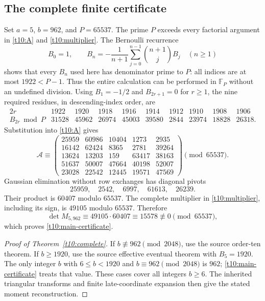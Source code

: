 \subsection{The complete finite certificate}

Set $a=5$, $b=962$, and $P=65537$. The prime $P$ exceeds every
factorial argument in \eqref{t10:A} and \eqref{t10:multiplier}.
The Bernoulli recurrence
\begin{equation}\label{t10:Brec}
 B_0=1,\qquad
 B_n=-\frac1{n+1}\sum_{j=0}^{n-1}\binom{n+1}{j}B_j
 \quad(n\ge1)
\end{equation}
shows that every $B_n$ used here has denominator prime to $P$:
all indices are at most $1922<P-1$. Thus the entire calculation
can be performed in $\mathbb F_P$ without an undefined division.
Using $B_1=-1/2$ and $B_{2r+1}=0$ for $r\ge1$, the nine required
residues, in descending-index order, are
\begin{equation}\label{t10:Bvalues}
\begin{array}{c|rrrrrrrrr}
2r&1922&1920&1918&1916&1914&1912&1910&1908&1906\\\hline
 B_{2r}\bmod P&31528&45962&26974&45003&39580&2844&23974&18828&26318.
\end{array}
\end{equation}
Substitution into \eqref{t10:A} gives
\begin{equation}\label{t10:Amatrix}
\mathcal A\equiv
\begin{pmatrix}
25959&60986&10404&1273&2935\\
16142&62424&8365&2781&39264\\
13624&13203&159&63417&38163\\
51637&50007&47664&40198&52007\\
23028&22542&12445&19571&47569
\end{pmatrix}\pmod{65537}.
\end{equation}
Gaussian elimination without row exchanges has diagonal pivots
\[
25959,\quad2542,\quad6997,\quad61613,\quad26239.
\]
Their product is $60407$ modulo $65537$. The complete multiplier
in \eqref{t10:multiplier}, including its sign, is $49105$ modulo
$65537$. Therefore
\[
\det M_{5,962}\equiv49105\cdot60407\equiv15578\not\equiv0
     \pmod{65537},
\]
which proves \eqref{t10:main-certificate}.

\begin{proof}[Proof of Theorem~\ref{t10:complete}]
If $b\not\equiv962\pmod{2048}$, use the source order-ten theorem.
If $b\ge1920$, use the source effective eventual theorem with
$B_5=1920$. The only integer $b$ with
$6\le b<1920$ and $b\equiv962\pmod{2048}$ is $962$;
\eqref{t10:main-certificate} treats that value. These cases cover
all integers $b\ge6$. The inherited triangular transforms and
finite late-coordinate expansion then give the stated moment
reconstruction.\end{proof}

